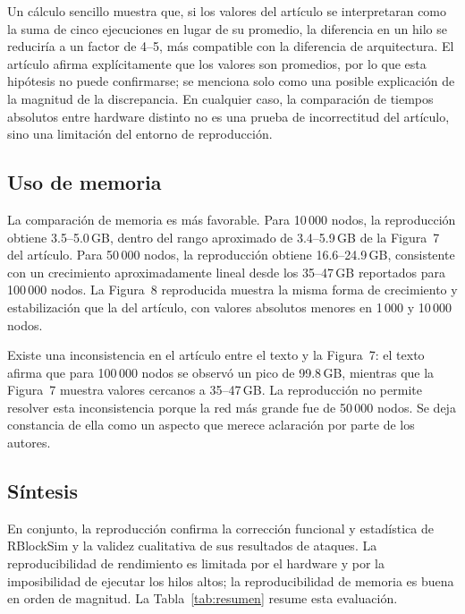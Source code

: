 \documentclass[11pt,a4paper,oneside]{article}
\begin{document}
Un cálculo sencillo muestra que, si los valores del artículo se interpretaran como la suma de cinco ejecuciones en lugar de su promedio, la diferencia en un hilo se reduciría a un factor de 4--5, más compatible con la diferencia de arquitectura. El artículo afirma explícitamente que los valores son promedios, por lo que esta hipótesis no puede confirmarse; se menciona solo como una posible explicación de la magnitud de la discrepancia. En cualquier caso, la comparación de tiempos absolutos entre hardware distinto no es una prueba de incorrectitud del artículo, sino una limitación del entorno de reproducción.

\subsection{Uso de memoria}

La comparación de memoria es más favorable. Para 10\,000 nodos, la reproducción obtiene 3.5--5.0\,GB, dentro del rango aproximado de 3.4--5.9\,GB de la Figura~7 del artículo. Para 50\,000 nodos, la reproducción obtiene 16.6--24.9\,GB, consistente con un crecimiento aproximadamente lineal desde los 35--47\,GB reportados para 100\,000 nodos. La Figura~8 reproducida muestra la misma forma de crecimiento y estabilización que la del artículo, con valores absolutos menores en 1\,000 y 10\,000 nodos.

Existe una inconsistencia en el artículo entre el texto y la Figura~7: el texto afirma que para 100\,000 nodos se observó un pico de 99.8\,GB, mientras que la Figura~7 muestra valores cercanos a 35--47\,GB. La reproducción no permite resolver esta inconsistencia porque la red más grande fue de 50\,000 nodos. Se deja constancia de ella como un aspecto que merece aclaración por parte de los autores.

\subsection{Síntesis}

En conjunto, la reproducción confirma la corrección funcional y estadística de RBlockSim y la validez cualitativa de sus resultados de ataques. La reproducibilidad de rendimiento es limitada por el hardware y por la imposibilidad de ejecutar los hilos altos; la reproducibilidad de memoria es buena en orden de magnitud. La Tabla~\ref{tab:resumen} resume esta evaluación.

\end{document}
